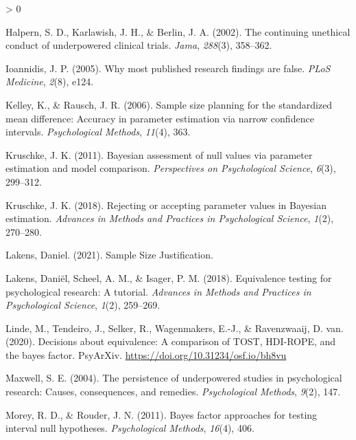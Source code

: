 \documentclass[
  english,
  man,floatsintext]{apa6}
\newlength{\cslhangindent}
\newenvironment{CSLReferences}[2] %
 {%
  \setlength{\parindent}{0pt}
  \ifodd #1 \everypar{\setlength{\hangindent}{\cslhangindent}}\ignorespaces\fi
  \ifnum #2 > 0
  \setlength{\parskip}{#2\baselineskip}
  \fi
 }%
 {}
\begin{document}
\hypertarget{refs}{}
\begin{CSLReferences}{1}{0}
\leavevmode\hypertarget{ref-halpern_continuing_2002}{}%
Halpern, S. D., Karlawish, J. H., \& Berlin, J. A. (2002). The continuing unethical conduct of underpowered clinical trials. \emph{Jama}, \emph{288}(3), 358--362.

\leavevmode\hypertarget{ref-ioannidis_why_2005}{}%
Ioannidis, J. P. (2005). Why most published research findings are false. \emph{PLoS Medicine}, \emph{2}(8), e124.

\leavevmode\hypertarget{ref-kelley_sample_2006}{}%
Kelley, K., \& Rausch, J. R. (2006). Sample size planning for the standardized mean difference: {Accuracy} in parameter estimation via narrow confidence intervals. \emph{Psychological Methods}, \emph{11}(4), 363.

\leavevmode\hypertarget{ref-kruschke_bayesian_2011}{}%
Kruschke, J. K. (2011). Bayesian assessment of null values via parameter estimation and model comparison. \emph{Perspectives on Psychological Science}, \emph{6}(3), 299--312.

\leavevmode\hypertarget{ref-kruschke_rejecting_2018}{}%
Kruschke, J. K. (2018). Rejecting or accepting parameter values in {Bayesian} estimation. \emph{Advances in Methods and Practices in Psychological Science}, \emph{1}(2), 270--280.

\leavevmode\hypertarget{ref-lakens_sample_2021}{}%
Lakens, Daniel. (2021). Sample {Size} {Justification}.

\leavevmode\hypertarget{ref-lakens_equivalence_2018}{}%
Lakens, Daniël, Scheel, A. M., \& Isager, P. M. (2018). Equivalence testing for psychological research: {A} tutorial. \emph{Advances in Methods and Practices in Psychological Science}, \emph{1}(2), 259--269.

\leavevmode\hypertarget{ref-linde_tendeiro_selker_wagenmakers_van_ravenzwaaij_2020}{}%
Linde, M., Tendeiro, J., Selker, R., Wagenmakers, E.-J., \& Ravenzwaaij, D. van. (2020). Decisions about equivalence: A comparison of TOST, HDI-ROPE, and the bayes factor. PsyArXiv. \url{https://doi.org/10.31234/osf.io/bh8vu}

\leavevmode\hypertarget{ref-maxwell_persistence_2004}{}%
Maxwell, S. E. (2004). The persistence of underpowered studies in psychological research: Causes, consequences, and remedies. \emph{Psychological Methods}, \emph{9}(2), 147.

\leavevmode\hypertarget{ref-morey_bayes_2011}{}%
Morey, R. D., \& Rouder, J. N. (2011). Bayes factor approaches for testing interval null hypotheses. \emph{Psychological Methods}, \emph{16}(4), 406.


\end{CSLReferences}
\end{document}
